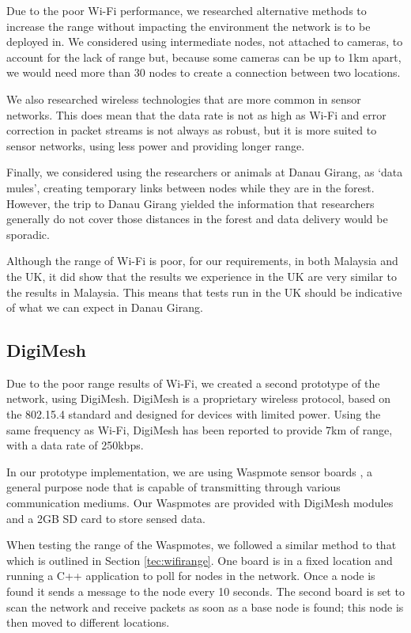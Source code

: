 Due to the poor Wi-Fi performance, we researched alternative methods to increase the range without impacting the environment the network is to be deployed in. We considered using intermediate nodes, not attached to cameras, to account for the lack of range but, because some cameras can be up to 1km apart, we would need more than 30 nodes to create a connection between two locations.
			
We also researched wireless technologies that are more common in sensor networks. This does mean that the data rate is not as high as Wi-Fi and error correction in packet streams is not always as robust, but it is more suited to sensor networks, using less power and providing longer range.
			
Finally, we considered using the researchers or animals at Danau Girang, as `data mules', creating temporary links between nodes while they are in the forest. However, the trip to Danau Girang yielded the information that researchers generally do not cover those distances in the forest and data delivery would be sporadic.
			
Although the range of Wi-Fi is poor, for our requirements, in both Malaysia and the UK, it did show that the results we experience in the UK are very similar to the results in Malaysia. This means that tests run in the UK should be indicative of what we can expect in Danau Girang.

\subsection{DigiMesh}\label{tech:digimesh}
		Due to the poor range results of Wi-Fi, we created a second prototype of the network, using DigiMesh. DigiMesh is a proprietary wireless protocol, based on the 802.15.4 standard and designed for devices with limited power. Using the same frequency as Wi-Fi, DigiMesh has been reported to provide 7km of range, with a data rate of 250kbps.
		
In our prototype implementation, we are using Waspmote sensor boards \cite{waspmote}, a general purpose node that is capable of transmitting through various communication mediums. Our Waspmotes are provided with DigiMesh modules and a 2GB SD card to store sensed data.
		
When testing the range of the Waspmotes, we followed a similar method to that which is outlined in Section \ref{tec:wifirange}. One board is in a fixed location and running a C++ application to poll for nodes in the network. Once a node is found it sends a message to the node every 10 seconds. The second board is set to scan the network and receive packets as soon as a base node is found; this node is then moved to different locations.
			
